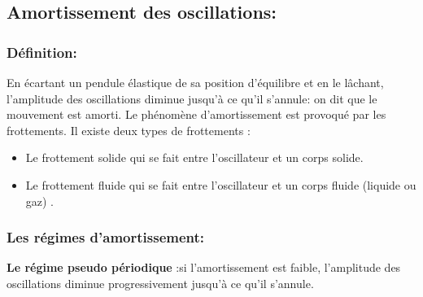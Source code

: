 \documentclass[12pt]{article}
\begin{document}
\subsection{Amortissement des oscillations: }

\subsubsection{Définition:}

En écartant un pendule élastique de sa position d'équilibre et en le lâchant, l'amplitude des oscillations diminue jusqu'à ce qu'il
s'annule: on dit que le mouvement est amorti. Le phénomène d'amortissement est provoqué par les frottements.
Il existe deux types de frottements :
\begin{itemize}
	\item Le frottement solide qui se fait entre l'oscillateur et un corps solide.
	\item Le frottement fluide qui se fait entre l'oscillateur et un corps fluide (liquide ou gaz) .
\end{itemize}

\subsubsection{Les régimes d'amortissement: }

\textbf{Le régime pseudo périodique }:si l'amortissement est faible, l'amplitude des oscillations diminue progressivement
jusqu'à ce qu'il s'annule.
\end{document}
